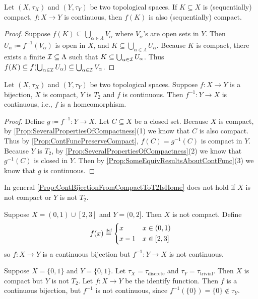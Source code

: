 \documentclass[screen,single]{techreport}
\numberwithin{equation}{section}
\begin{document}
\begin{proposition}\label{Prop:ContFuncPreserveCompact}
	Let $(X,\tau_X)$ and $(Y,\tau_Y)$ be two topological spaces.
	If $K \subseteq X$ is (sequentially) compact, $f : X \to Y$ is continuous, then $f(K)$ is also (sequentially) compact.
\end{proposition}
\begin{proof}
	Suppose $f(K) \subseteq \bigcup_{\alpha \in \Lambda} V_\alpha$ where $V_\alpha$'s are open sets in $Y$.
	Then $U_\alpha \coloneqq f^{-1}(V_\alpha)$ is open in $X$, and $K \subseteq \bigcup_{\alpha \in \Lambda} U_\alpha$.
	Because $K$ is compact, there exists a finite $\mathcal{I} \subseteq \Lambda$ such that $K \subseteq \bigcup_{\alpha \in \mathcal{I}} U_\alpha$.
	Thus $f(K) \subseteq f(\bigcup_{\alpha \in \mathcal{I}} U_\alpha) \subseteq \bigcup_{\alpha \in \mathcal{I}} V_\alpha$.
\end{proof}

\begin{proposition}\label{Prop:ContBijectionFromCompactToT2IsHome}
	Let $(X,\tau_X)$ and $(Y,\tau_Y)$ be two topological spaces.
	Suppose $f : X \to Y$ is a bijection, $X$ is compact, $Y$ is $T_2$ and $f$ is continuous.
	Then $f^{-1} : Y \to X$ is continuous, i.e., $f$ is a homeomorphism.
\end{proposition}
\begin{proof}
	Define $g \coloneqq f^{-1} : Y \to X$.
	Let $C \subseteq X$ be a closed set.
	Because $X$ is compact, by \cref{Prop:SeveralPropertiesOfCompactness}(1) we know that $C$ is also compact.
	Thus by \cref{Prop:ContFuncPreserveCompact}, $f(C) = g^{-1}(C)$ is compact in $Y$.
	Because $Y$ is $T_2$, by \cref{Prop:SeveralPropertiesOfCompactness}(2) we know that $g^{-1}(C)$ is closed in $Y$.
	Then by \cref{Prop:SomeEquivResultsAboutContFunc}(3) we know that $g$ is continuous.
\end{proof}

\begin{example}\label{Exa:ContBijectionNotHome}
	In general \cref{Prop:ContBijectionFromCompactToT2IsHome} does not hold if $X$ is not compact or $Y$ is not $T_2$.
	
	Suppose $X = (0,1) \cup [2,3]$ and $Y=(0,2]$. Then $X$ is not compact.
	Define
	\[
	f(x) \mathrel{\overset{\underset{\textnormal{def}}{}}{=}} \begin{dcases} x & x \in (0,1) \\ x-1 & x \in [2,3] \end{dcases}
	\]
	so $f:X \to Y$ is a continuous bijection but $f^{-1} : Y \to X$ is not continuous.
	
	Suppose $X=\{0,1\}$ and $Y = \{0,1\}$.
	Let $\tau_X = \tau_{\mathrm{discrete}}$ and $\tau_Y = \tau_{\mathrm{trivial}}$.
	Then $X$ is compact but $Y$ is not $T_2$.
	Let $f: X \to Y$ be the identify function.
	Then $f$ is a continuous bijection, but $f^{-1}$ is not continuous, since $f^{-1}(\{0\}) = \{0\} \not\in \tau_Y$.
\end{example}
\end{document}
